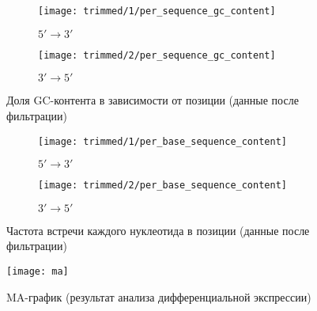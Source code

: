 \documentclass[main.tex]{subfiles}
\begin{document}
\begin{figure}[H]
    \centering
    \begin{subfigure}{.5\textwidth}
        \centering
        \texttt{[image: trimmed/1/per\_sequence\_gc\_content]}
        \caption{$ 5' \to 3' $}
    \end{subfigure}%
    \begin{subfigure}{.5\textwidth}
        \centering
        \texttt{[image: trimmed/2/per\_sequence\_gc\_content]}
        \caption{$ 3' \to 5' $}
    \end{subfigure}
    \caption{Доля GC-контента в зависимости от позиции (данные после фильтрации)}
    \label{fig:trimmed:gc}
\end{figure}

\begin{figure}[H]
    \centering
    \begin{subfigure}{.5\textwidth}
        \centering
        \texttt{[image: trimmed/1/per\_base\_sequence\_content]}
        \caption{$ 5' \to 3' $}
    \end{subfigure}%
    \begin{subfigure}{.5\textwidth}
        \centering
        \texttt{[image: trimmed/2/per\_base\_sequence\_content]}
        \caption{$ 3' \to 5' $}
    \end{subfigure}
    \caption{Частота встречи каждого нуклеотида в позиции (данные после фильтрации)}
    \label{fig:trimmed:sequence_content}
\end{figure}

\begin{figure}[H]
    \centering

    \texttt{[image: ma]}
    \caption{MA-график (результат анализа дифференциальной экспрессии)}
    \label{fig:ma}
\end{figure}
\end{document}
